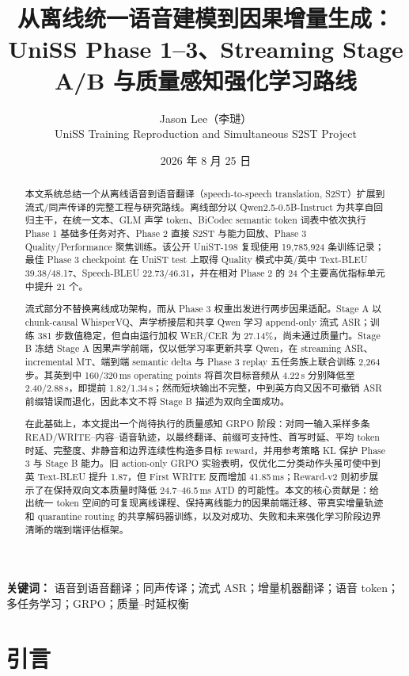 \documentclass[11pt,a4paper]{article}
\title{\textbf{从离线统一语音建模到因果增量生成：\\
UniSS Phase 1--3、Streaming Stage A/B 与质量感知强化学习路线}}
\author{Jason Lee（李琎）\\
\small UniSS Training Reproduction and Simultaneous S2ST Project}
\date{2026 年 8 月 25 日}
\begin{document}
\maketitle

\begin{abstract}
本文系统总结一个从离线语音到语音翻译（speech-to-speech translation, S2ST）扩展到流式/同声传译的完整工程与研究路线。离线部分以 Qwen2.5-0.5B-Instruct 为共享自回归主干，在统一文本、GLM 声学 token、BiCodec semantic token 词表中依次执行 Phase 1 基础多任务对齐、Phase 2 直接 S2ST 与能力回放、Phase 3 Quality/Performance 聚焦训练。该公开 UniST-198 复现使用 19,785,924 条训练记录；最佳 Phase 3 checkpoint 在 UniST test 上取得 Quality 模式中英/英中 Text-BLEU 39.38/48.17、Speech-BLEU 22.73/46.31，并在相对 Phase 2 的 24 个主要高优指标单元中提升 21 个。

流式部分不替换离线成功架构，而从 Phase 3 权重出发进行两步因果适配。Stage A 以 chunk-causal WhisperVQ、声学桥接层和共享 Qwen 学习 append-only 流式 ASR；训练 381 步数值稳定，但自由运行加权 WER/CER 为 27.14\%，尚未通过质量门。Stage B 冻结 Stage A 因果声学前端，仅以低学习率更新共享 Qwen，在 streaming ASR、incremental MT、端到端 semantic delta 与 Phase 3 replay 五任务族上联合训练 2,264 步。其英到中 160/320\,ms operating points 将首次目标音频从 4.22\,s 分别降低至 2.40/2.88\,s，即提前 1.82/1.34\,s；然而短块输出不完整，中到英方向又因不可撤销 ASR 前缀错误而退化，因此本文不将 Stage B 描述为双向全面成功。

在此基础上，本文提出一个尚待执行的质量感知 GRPO 阶段：对同一输入采样多条 READ/WRITE--内容--语音轨迹，以最终翻译、前缀可支持性、首写时延、平均 token 时延、完整度、非静音和边界连续性构造多目标 reward，并用参考策略 KL 保护 Phase 3 与 Stage B 能力。旧 action-only GRPO 实验表明，仅优化二分类动作头虽可使中到英 Text-BLEU 提升 1.87，但 First WRITE 反而增加 41.85\,ms；Reward-v2 则初步展示了在保持双向文本质量时降低 24.7--46.5\,ms ATD 的可能性。本文的核心贡献是：给出统一 token 空间的可复现离线课程、保持离线能力的因果前端迁移、带真实增量轨迹和 quarantine routing 的共享解码器训练，以及对成功、失败和未来强化学习阶段边界清晰的端到端评估框架。
\end{abstract}

\noindent\textbf{关键词：} 语音到语音翻译；同声传译；流式 ASR；增量机器翻译；语音 token；多任务学习；GRPO；质量--时延权衡

\section{引言}
\end{document}
